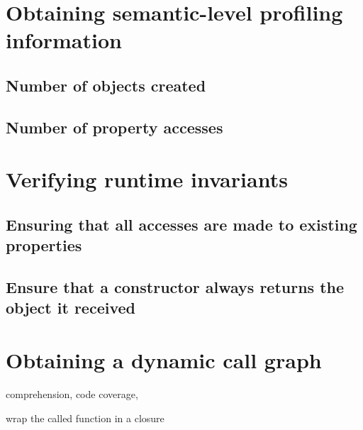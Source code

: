 \section{Obtaining semantic-level profiling information}

\subsection{Number of objects created}

\subsection{Number of property accesses}

\section{Verifying runtime invariants}

\subsection{Ensuring that all accesses are made to existing properties}

\subsection{Ensure that a constructor always returns the object it received}


\section{Obtaining a dynamic call graph}

comprehension, code coverage, 






wrap the called function in a closure


